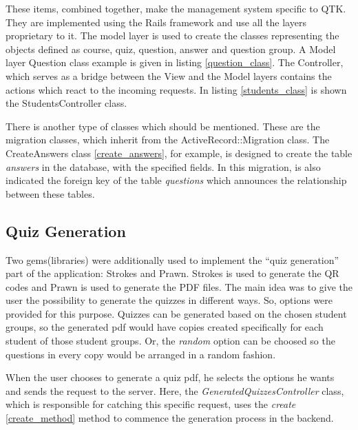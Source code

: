 These items, combined together, make the management system specific to QTK. They are implemented using the Rails framework and use all the layers proprietary to it. The model layer is used to create the classes representing the objects defined as course, quiz, question, answer and question group. A Model layer Question class example is given in listing \ref{question_class}.
The Controller, which serves as a bridge between the View and the Model layers contains the actions which react to the incoming requests. In listing \ref{students_class} is shown the StudentsController class. 

There is another type of classes which should be mentioned. These are the migration classes, which inherit from the ActiveRecord::Migration class. The CreateAnswers class \ref{create_answers}, for example, is designed to create the table \textit{answers} in the database, with the specified fields. In this migration, is also indicated the foreign key of the table \textit{questions} which announces the relationship between these tables.








\subsection{Quiz Generation}
Two gems(libraries) were additionally used to implement the ``quiz generation'' part of the application: Strokes and Prawn. Strokes is used to generate the QR codes and Prawn is used to generate the PDF files. The main idea was to give the user the possibility to generate the quizzes in different ways. So, options were provided for this purpose. Quizzes can be generated based on the chosen student groups, so the generated pdf would have copies created specifically for each student of those student groups. Or, the \textit{random} option can be choosed so the questions in every copy would be arranged in a random fashion.

When the user chooses to generate a quiz pdf, he selects the options he wants and sends the request to the server. Here, the \textit{GeneratedQuizzesController} class, which is responsible for catching this specific request, uses the \textit{create} \ref{create_method} method to commence the generation process in the backend. 

